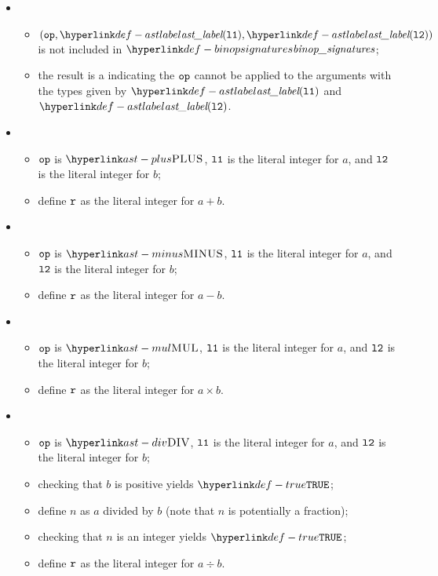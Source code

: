 \ProseParagraph
\OneApplies
\begin{itemize}
  \item {}
  \begin{itemize}
    \item $(\op, \astlabel(\vlone), \astlabel(\vltwo))$ is not included in $\binopsignatures$;
    \item the result is a \typingerrorterm{} indicating the $\texttt{op}$ cannot be applied to the arguments
          with the types given by $\astlabel(\vlone)$ and $\astlabel(\vltwo)$.
  \end{itemize}

  \item {}
  \begin{itemize}
    \item $\texttt{op}$ is $\PLUS$, $\texttt{l1}$ is the literal integer for $a$, and $\texttt{l2}$ is the literal integer for $b$;
    \item define $\texttt{r}$ as the literal integer for $a+b$.
  \end{itemize}

  \item {}
  \begin{itemize}
    \item $\texttt{op}$ is $\MINUS$, $\texttt{l1}$ is the literal integer for $a$, and $\texttt{l2}$ is the literal integer for $b$;
    \item define $\texttt{r}$ as the literal integer for $a-b$.
  \end{itemize}

  \item {}
  \begin{itemize}
    \item $\texttt{op}$ is $\MUL$, $\texttt{l1}$ is the literal integer for $a$, and $\texttt{l2}$ is the literal integer for $b$;
    \item define $\texttt{r}$ as the literal integer for $a\times b$.
  \end{itemize}

  \item {}
  \begin{itemize}
    \item $\texttt{op}$ is $\DIV$, $\texttt{l1}$ is the literal integer for $a$, and $\texttt{l2}$ is the literal integer for $b$;
    \item checking that $b$ is positive yields $\True$\ProseOrTypeError;
    \item define $n$ as $a$ divided by $b$ (note that $n$ is potentially a fraction);
    \item checking that $n$ is an integer yields $\True$\ProseOrTypeError;
    \item define $\texttt{r}$ as the literal integer for $a\div b$.
  \end{itemize}


\end{itemize}
